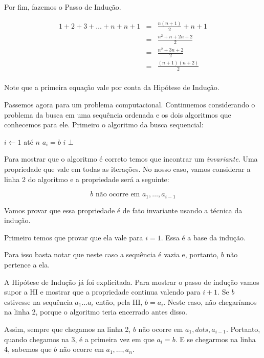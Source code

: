 Por fim, fazemos o Passo de Indução.

\begin{eqnarray*}
  1 + 2 + 3 + \dots + n + n + 1 & = & \frac{n(n+1)}{2} + n + 1 \\
  & = & \frac{n^2 + n + 2n + 2}{2} \\
  & = & \frac{n^2 + 3n + 2}{2} \\
  & = & \frac{(n+1)(n+2)}{2} \\
\end{eqnarray*}

Note que a primeira equação vale por conta da Hipótese de Indução.

Passemos agora para um problema computacional.
Continuemos considerando o problema da busca em uma sequência ordenada e os dois algoritmos que conhecemos para ele.
Primeiro o algoritmo da busca sequencial:

\begin{codebox}
\li \For $i \gets 1$ até $n$
\li \Do \If $a_i = b$
\li     \Then \Return $i$
        \End
    \End
\li \Return $\bot$
\End
\end{codebox}

Para mostrar que o algoritmo é correto temos que incontrar um {\em invariante}.
Uma propriedade que vale em todas as iterações.
No nosso caso, vamos considerar a linha 2 do algoritmo e a propriedade será a seguinte:

\begin{displaymath}
b \textrm{ não ocorre em } a_1, \dots, a_{i-1}
\end{displaymath}

Vamos provar que essa propriedade é de fato invariante usando a técnica da indução.

Primeiro temos que provar que ela vale para $i = 1$.
Essa é a base da indução.

Para isso basta notar que neste caso a sequência é vazia e, portanto, $b$ não pertence a ela.

A Hipótese de Indução já foi explicitada.
Para mostrar o passo de indução vamos supor a HI e mostrar que a propriedade continua valendo para $i+1$.
Se $b$ estivesse na sequência $a_1 \dots a_i$ então, pela HI, $b = a_i$.
Neste caso, não chegaríamos na linha 2, porque o algoritmo teria encerrado antes disso.

Assim, sempre que chegamos na linha 2, $b$ não ocorre em $a_1, dots, a_{i-1}$.
Portanto, quando chegamos na 3, é a primeira vez em que $a_i = b$.
E se chegarmos na linha 4, sabemos que $b$ não ocorre em $a_1, \dots, a_n$.


